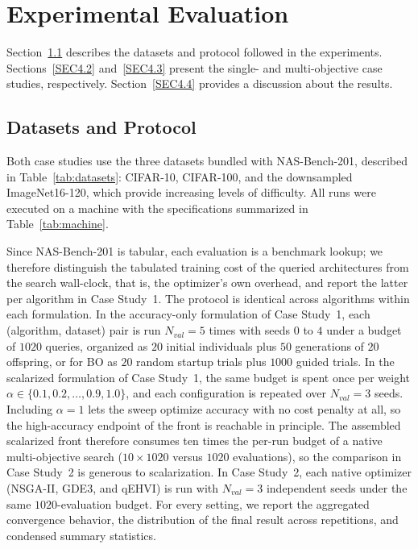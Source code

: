 \documentclass[runningheads]{llncs}
\begin{document}
\section{Experimental Evaluation} \label{SEC4}
\noindent Section~\ref{SEC4.1} describes the datasets and protocol followed in the experiments.  Sections~\ref{SEC4.2} and~\ref{SEC4.3} present the single- and multi-objective case studies, respectively. Section~\ref{SEC4.4} provides a discussion about the results.

%
%
\subsection{Datasets and Protocol} \label{SEC4.1}
Both case studies use the three datasets bundled with NAS-Bench-201, described in Table~\ref{tab:datasets}: CIFAR-10, CIFAR-100, and the downsampled ImageNet16-120, which provide increasing levels of difficulty. All runs were executed on a machine with the specifications summarized in Table~\ref{tab:machine}. 

Since NAS-Bench-201 is tabular, each evaluation is a benchmark lookup; we therefore distinguish the tabulated training cost of the queried architectures from the search wall-clock, that is, the optimizer's own overhead, and report the latter per algorithm in Case Study~1. The protocol is identical across algorithms within each formulation. In the accuracy-only formulation of Case Study~1, each (algorithm, dataset) pair is run $N_{val}=5$ times with seeds $0$ to $4$ under a budget of $1020$ queries, organized as $20$ initial individuals plus $50$ generations of $20$ offspring, or for BO as $20$ random startup trials plus $1000$ guided trials. In the scalarized formulation of Case Study~1, the same budget is spent once per weight $\alpha\in\{0.1,0.2,\dots,0.9,1.0\}$, and each configuration is repeated over $N_{val}=3$ seeds. Including $\alpha=1$ lets the sweep optimize accuracy with no cost penalty at all, so the high-accuracy endpoint of the front is reachable in principle. The assembled scalarized front therefore consumes ten times the per-run budget of a native multi-objective search ($10 \times 1020$ versus $1020$ evaluations), so the comparison in Case Study~2 is generous to scalarization. In Case Study~2, each native optimizer (NSGA-II, GDE3, and qEHVI) is run with $N_{val}=3$ independent seeds under the same $1020$-evaluation budget. For every setting, we report the aggregated convergence behavior, the distribution of the final result across repetitions, and condensed summary statistics.
\end{document}
